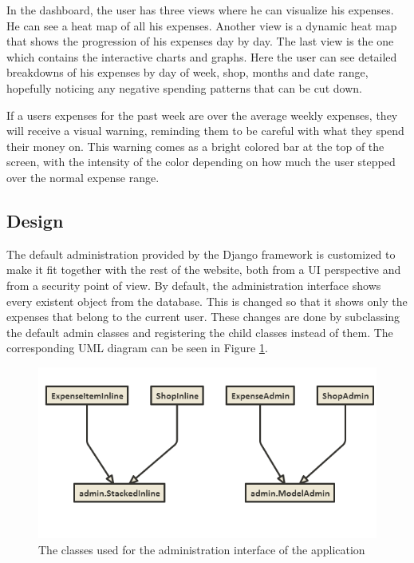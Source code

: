 In the dashboard, the user has three views where he can visualize his expenses. He can see a heat map of all his expenses. Another view is a dynamic heat map that shows the progression of his expenses day by day. The last view is the one which contains the interactive charts and graphs. Here the user can see detailed breakdowns of his expenses by day of week, shop, months and date range, hopefully noticing any negative spending patterns that can be cut down. 

If a users expenses for the past week are over the average weekly expenses, they will receive a visual warning, reminding them to be careful with what they spend their money on. This warning comes as a bright colored bar at the top of the screen, with the intensity of the color depending on how much the user stepped over the normal expense range. 
\subsection{Design}
The default administration provided by the Django framework is customized to make it fit together with the rest of the website, both from a UI perspective and from a security point of view. By default, the administration interface shows every existent object from the database. This is changed so that it shows only the expenses that belong to the current user. These changes are done by subclassing the default admin classes and registering the child classes instead of them. The corresponding UML diagram can be seen in Figure \ref{fig:admin_classes}.
\begin{figure}[h!]
\begin{center}
\includegraphics[width=\linewidth]{img/admin_classes.png}
\caption{\label{fig:admin_classes}
The classes used for the administration interface of the application}
\end{center}
\end{figure}

